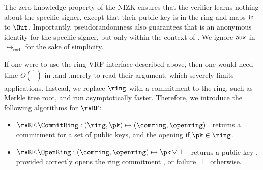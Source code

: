 

The zero-knowledge property of the NIZK ensures that the verifier learns nothing about the specific
signer, except that their public key is in the ring and maps $\mathsf{in}$ to $\Out$.
Importantly, pseudorandomness also guarantees that \Out is an anonymous identity
for the specific signer, but only within the context of \msg.  We ignore $ \mathsf{aux} $ in $ \rel_{\mathsf{rvrf}} $ for the sake of simplicity. 





If one were to use the ring VRF interface described above, then one would need time
$O(|\ring|)$ in \rVRF.\rSign and \rVRF.\rVerify merely to read their \ring
argument, which severely limits applications.
Instead, we replace $ \ring $ with a commitment to the ring, such as Merkle tree root, and run asymptotically faster. Therefore, we introduce the following algorithms for $ \rVRF $:
\begin{itemize}
\item $\rVRF.\CommitRing : (\ring,\pk) \mapsto (\comring,\openring)$ \,
    returns a commitment for a set \ring of public keys, and
     the opening \openring if $\pk \in \ring$.
\item $\rVRF.\OpenRing : (\comring,\openring) \mapsto \pk \, \lor \perp$ \,
    returns a public key \pk, provided \openring correctly opens
    the ring commitment \comring, or failure $\perp$ otherwise.
\end{itemize}

